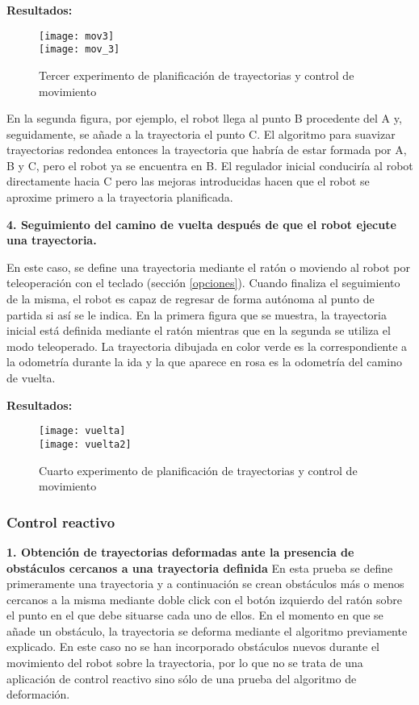 \textbf{Resultados:}
\begin{figure}[h]
  \centering\texttt{[image: mov3]}\\
  \vspace{2cm}\texttt{[image: mov\_3]}
  \caption{Tercer experimento de planificación de trayectorias y control de movimiento}\label{fg:mov3}
\end{figure}


En la segunda figura, por ejemplo, el robot llega al punto B procedente del A y, seguidamente, se añade a la trayectoria el punto C. El algoritmo para suavizar trayectorias redondea entonces la trayectoria que habría de estar formada por A, B y C, pero el robot ya se encuentra en B. El regulador inicial conduciría al robot directamente hacia C pero las mejoras introducidas hacen que el robot se aproxime primero a la trayectoria planificada.

\noindent
\textbf{\textbf{4.} Seguimiento del camino de vuelta después de que el robot ejecute una trayectoria.}

En este caso, se define una trayectoria mediante el ratón o moviendo al robot por teleoperación con el teclado (sección \ref{opciones}). Cuando finaliza el seguimiento de la misma, el robot es capaz de regresar de forma autónoma al punto de partida si así se le indica. En la primera figura que se muestra, la trayectoria inicial está definida mediante el ratón mientras que en la segunda se utiliza el modo teleoperado. La trayectoria dibujada en color verde es la correspondiente a la odometría durante la ida y la que aparece en rosa es la odometría del camino de vuelta.

\textbf{Resultados:}
\begin{figure}[h]
  \centering\texttt{[image: vuelta]}\\
  \hspace{0.5cm}\texttt{[image: vuelta2]}
  \caption{Cuarto experimento de planificación de trayectorias y control de movimiento}\label{fg:mov4}
\end{figure}


\subsubsection{Control reactivo}

\noindent
\textbf{\textbf{1.} Obtención de trayectorias deformadas ante la presencia de obstáculos cercanos a una trayectoria definida}
En esta prueba se define primeramente una trayectoria y a continuación se crean obstáculos más o menos cercanos a la misma mediante doble click con el botón izquierdo del ratón sobre el punto en el que debe situarse cada uno de ellos. En el momento en que se añade un obstáculo, la trayectoria se deforma mediante el algoritmo previamente explicado. En este caso no se han incorporado obstáculos nuevos durante el movimiento del robot sobre la trayectoria, por lo que no se trata de una aplicación de control reactivo sino sólo de una prueba del algoritmo de deformación.

